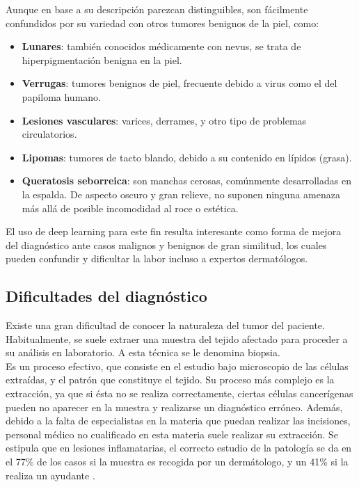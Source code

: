 Aunque en base a su descripción parezcan distinguibles, son fácilmente confundidos por su variedad con otros tumores benignos de la piel, como:

\begin{itemize}
	\item \textbf{Lunares}: también conocidos médicamente con nevus, se trata de hiperpigmentación benigna en la piel.
	\item \textbf{Verrugas}: tumores benignos de piel, frecuente debido a virus como el del papiloma humano.
	\item \textbf{Lesiones vasculares}: varices, derrames, y otro tipo de problemas circulatorios.
	\item \textbf{Lipomas}: tumores de tacto blando, debido a su contenido en lípidos (grasa).
	\item \textbf{Queratosis seborreica}: son manchas cerosas, comúnmente desarrolladas en la espalda. De aspecto oscuro y gran relieve, no suponen ninguna amenaza más allá de posible incomodidad al roce o estética.
\end{itemize}

El uso de deep learning para este fin resulta interesante como forma de mejora del diagnóstico ante casos malignos y benignos de gran similitud, los cuales pueden confundir y dificultar la labor incluso a expertos dermatólogos.

\subsection{Dificultades del diagnóstico}

Existe una gran dificultad de conocer la naturaleza del tumor del paciente. Habitualmente, se suele extraer una muestra del tejido afectado para proceder a su análisis en laboratorio. A esta técnica se le denomina biopsia.\\

Es un proceso efectivo, que consiste en el estudio bajo microscopio de las células extraídas, y el patrón que constituye el tejido. Su proceso más complejo es la extracción, ya que si ésta no se realiza correctamente, ciertas células cancerígenas pueden no aparecer en la muestra y realizarse un diagnóstico erróneo. Además, debido a la falta de especialistas en la materia que puedan realizar las incisiones, personal médico no cualificado en esta materia suele realizar su extracción. Se estipula que en lesiones inflamatarias, el correcto estudio de la patología se da en el 77\% de los casos si la muestra es recogida por un dermátologo, y un 41\% si la realiza un ayudante \cite{LLAMASVELASCO201212}.

